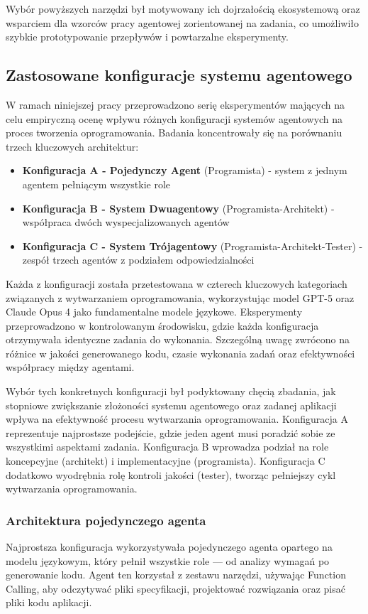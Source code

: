 Wybór powyższych narzędzi był motywowany ich dojrzałością ekosystemową oraz wsparciem dla wzorców pracy agentowej zorientowanej na zadania, co umożliwiło szybkie prototypowanie przepływów i powtarzalne eksperymenty.

\subsection{Zastosowane konfiguracje systemu agentowego}
W ramach niniejszej pracy przeprowadzono serię eksperymentów mających na celu empiryczną ocenę wpływu różnych konfiguracji
systemów agentowych na proces tworzenia oprogramowania. Badania koncentrowały się na porównaniu trzech kluczowych architektur:
\begin{itemize}
    \item \textbf{Konfiguracja A - Pojedynczy Agent} (Programista) - system z jednym agentem pełniącym wszystkie role
    \item \textbf{Konfiguracja B - System Dwuagentowy} (Programista-Architekt) - współpraca dwóch wyspecjalizowanych agentów
    \item \textbf{Konfiguracja C - System Trójagentowy} (Programista-Architekt-Tester) - zespół trzech agentów z podziałem odpowiedzialności
\end{itemize}

Każda z konfiguracji została przetestowana w czterech kluczowych kategoriach związanych z wytwarzaniem oprogramowania, wykorzystując model GPT-5 oraz Claude Opus 4 jako fundamentalne modele językowe. Eksperymenty przeprowadzono w kontrolowanym środowisku, gdzie każda konfiguracja otrzymywała identyczne zadania do wykonania. Szczególną uwagę zwrócono na różnice w jakości generowanego kodu, czasie wykonania zadań oraz efektywności współpracy między agentami.

Wybór tych konkretnych konfiguracji był podyktowany chęcią zbadania, jak stopniowe zwiększanie złożoności systemu agentowego oraz zadanej aplikacji wpływa na efektywność procesu wytwarzania oprogramowania. Konfiguracja A reprezentuje najprostsze podejście, gdzie jeden agent musi poradzić sobie ze wszystkimi aspektami zadania. Konfiguracja B wprowadza podział na role koncepcyjne (architekt) i implementacyjne (programista). Konfiguracja C dodatkowo wyodrębnia rolę kontroli jakości (tester), tworząc pełniejszy cykl wytwarzania oprogramowania.

\subsubsection*{Architektura pojedynczego agenta}
Najprostsza konfiguracja wykorzystywała pojedynczego agenta opartego na modelu językowym,  który pełnił wszystkie role — od analizy wymagań po generowanie kodu.  Agent ten korzystał z zestawu narzędzi, używając Function Calling, aby odczytywać pliki specyfikacji, projektować rozwiązania oraz pisać pliki kodu aplikacji.

